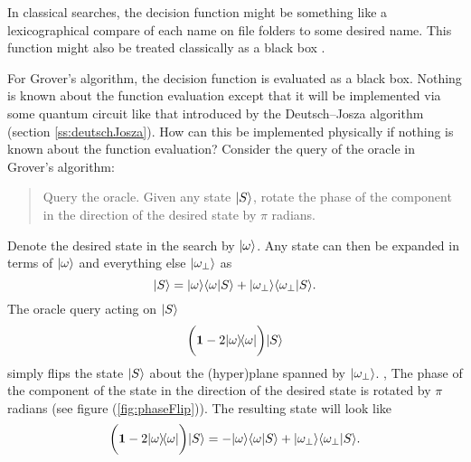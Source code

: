 In classical searches, the decision function might be something like
a lexicographical 
compare of each name on file folders to some desired name.  
This function might also be treated classically as a black 
box .

For Grover's algorithm, the decision function is evaluated as a black box.
Nothing is known about the function evaluation except that it will be
implemented via some quantum circuit like that introduced by the 
Deutsch--Josza algorithm (section \ref{ss:deutschJosza}).
How can this be implemented physically if nothing is known about the 
function evaluation? 
Consider the query of the oracle in Grover's algorithm:
\begin{quote}
Query the oracle.  Given any state ${|{S}\rangle}$, rotate  
the phase of the component in the direction of the desired state
by $\pi$ radians.
\end{quote}
Denote the desired state in the search by ${|{\omega}\rangle}$.
Any state can then be expanded in terms of ${|{\omega}\rangle}$ 
and everything else ${|{\omega_\perp}\rangle}$ as 
\begin{equation}
{|{S}\rangle} = {|{\omega}\rangle}{\langle{\omega}|{S}\rangle} + 
             {|{\omega_\perp}\rangle}{\langle{\omega_\perp}|{S}\rangle}.
\end{equation}
The oracle query acting on ${|{S}\rangle}$
\begin{equation}
\biggl( {\bf 1} - 2{|{\omega}\rangle\!\langle{\omega}|} \biggr) {|{S}\rangle}
\label{e:oracle}
\end{equation}
simply flips the state ${|{S}\rangle}$ about the (hyper)plane
spanned by ${|{\omega_\perp}\rangle}$.  \ie, The phase of the
component of the state in the direction of the desired
state is rotated by $\pi$ radians (see figure 
(\ref{fig:phaseFlip})).  
The resulting state will look like
\begin{equation}
\biggl( {\bf 1} - 2{|{\omega}\rangle\!\langle{\omega}|} \biggr) {|{S}\rangle}
= - {|{\omega}\rangle}{\langle{\omega}|{S}\rangle} + 
             {|{\omega_\perp}\rangle}{\langle{\omega_\perp}|{S}\rangle}.
\end{equation}
